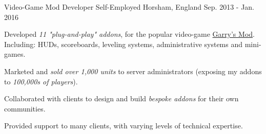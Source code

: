 \begin{cventries}
    {}

  \cventry
    {Video-Game Mod Developer}
    {Self-Employed}
    {Horsham, England}
    {Sep. 2013 - Jan. 2016}
    {
      \begin{cvitems}
        \item Developed \textit{11 "plug-and-play" addons}, for the popular video-game \href{https://gmod.facepunch.com/}{Garry's Mod}. Including: HUDs, scoreboards, leveling systems, administrative systems and mini-games.
        \item Marketed and \textit{sold over 1,000 units} to server administrators (exposing my addons to \textit{100,000s of players}).
        \item Collaborated with clients to design and build \textit{bespoke addons} for their own communities.
        \item Provided support to many clients, with varying levels of technical expertise.
      \end{cvitems}
    }
    {}


\end{cventries}
